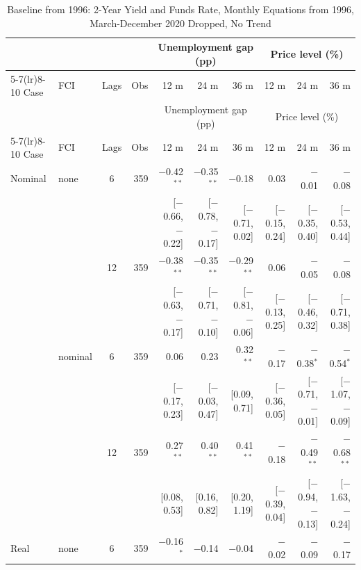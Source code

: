 \begingroup\scriptsize\setlength{\tabcolsep}{0.9pt}
\begin{longtable}{llcrrrrrrr}
\caption{Baseline from 1996: 2-Year Yield and Funds Rate, Monthly Equations from 1996, March-December 2020 Dropped, No Trend}\label{tab:appB}\\
\toprule
 & & & & \multicolumn{3}{c}{Unemployment gap (pp)} & \multicolumn{3}{c}{Price level (\%)}\\ \cmidrule(lr){5-7}\cmidrule(lr){8-10}
Case & FCI & Lags & Obs & 12 m & 24 m & 36 m & 12 m & 24 m & 36 m\\
\midrule\endfirsthead
\toprule
 & & & & \multicolumn{3}{c}{Unemployment gap (pp)} & \multicolumn{3}{c}{Price level (\%)}\\ \cmidrule(lr){5-7}\cmidrule(lr){8-10}
Case & FCI & Lags & Obs & 12 m & 24 m & 36 m & 12 m & 24 m & 36 m\\
\midrule\endhead
\bottomrule\endfoot
Nominal & none & 6 & 359 & $-$0.42$^{**}$ & $-$0.35$^{**}$ & $-$0.18 & 0.03 & $-$0.01 & $-$0.08\\
 & & & & {\scriptsize [$-$0.66, $-$0.22]} & {\scriptsize [$-$0.78, $-$0.17]} & {\scriptsize [$-$0.71, 0.02]} & {\scriptsize [$-$0.15, 0.24]} & {\scriptsize [$-$0.35, 0.40]} & {\scriptsize [$-$0.53, 0.44]}\\
 &  & 12 & 359 & $-$0.38$^{**}$ & $-$0.35$^{**}$ & $-$0.29$^{**}$ & 0.06 & $-$0.05 & $-$0.08\\
 & & & & {\scriptsize [$-$0.63, $-$0.17]} & {\scriptsize [$-$0.71, $-$0.10]} & {\scriptsize [$-$0.81, $-$0.06]} & {\scriptsize [$-$0.13, 0.25]} & {\scriptsize [$-$0.46, 0.32]} & {\scriptsize [$-$0.71, 0.38]}\\
 & nominal & 6 & 359 & 0.06 & 0.23 & 0.32$^{**}$ & $-$0.17 & $-$0.38$^{*}$ & $-$0.54$^{*}$\\
 & & & & {\scriptsize [$-$0.17, 0.23]} & {\scriptsize [$-$0.03, 0.47]} & {\scriptsize [0.09, 0.71]} & {\scriptsize [$-$0.36, 0.05]} & {\scriptsize [$-$0.71, $-$0.01]} & {\scriptsize [$-$1.07, $-$0.09]}\\
 &  & 12 & 359 & 0.27$^{**}$ & 0.40$^{**}$ & 0.41$^{**}$ & $-$0.18 & $-$0.49$^{**}$ & $-$0.68$^{**}$\\
 & & & & {\scriptsize [0.08, 0.53]} & {\scriptsize [0.16, 0.82]} & {\scriptsize [0.20, 1.19]} & {\scriptsize [$-$0.39, 0.04]} & {\scriptsize [$-$0.94, $-$0.13]} & {\scriptsize [$-$1.63, $-$0.24]}\\
\addlinespace
Real & none & 6 & 359 & $-$0.16$^{*}$ & $-$0.14 & $-$0.04 & $-$0.02 & $-$0.09 & $-$0.17\\

\end{longtable}
